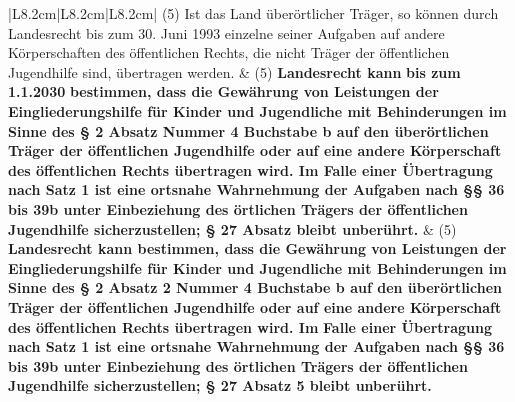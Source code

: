 \documentclass[10pt,a4paper,landscape]{article}
\begin{document}
\begin{longtable}{|L{8.2cm}|L{8.2cm}|L{8.2cm}|}
\hhline{|---|}
(5) \textcolor{diffred}{Ist das Land überörtlicher Träger, so  \newline können durch} Landesrecht \textcolor{diffred}{bis zum 30.  \newline Juni 1993 einzelne seiner Aufgaben} auf  \newline \textcolor{diffred}{andere Körperschaften des öffentlichen  \newline Rechts, die nicht} Träger der öffentlichen  \newline Jugendhilfe \textcolor{diffred}{sind,} übertragen \textcolor{diffred}{werden.} & (5) \textbf{Landesrecht kann }\textbf{\textcolor{diffred}{bis zum 1.1.2030}}\textbf{  \newline bestimmen, dass die Gewährung von  \newline Leistungen der Eingliederungshilfe für  \newline Kinder und Jugendliche mit  \newline Behinderungen im Sinne des \S{} 2 Absatz   Nummer 4 Buchstabe b auf den  \newline überörtlichen Träger der öffentlichen  \newline Jugendhilfe oder auf eine andere  \newline Körperschaft des öffentlichen Rechts  \newline übertragen wird. Im Falle einer  \newline Übertragung nach Satz 1 ist eine  \newline ortsnahe Wahrnehmung der Aufgaben  \newline nach \S{}\S{} 36 bis 39b unter Einbeziehung  \newline des örtlichen Trägers der öffentlichen  \newline Jugendhilfe sicherzustellen; \S{} 27 Absatz   bleibt unberührt.} & (5) \textbf{Landesrecht kann bestimmen, dass  \newline die Gewährung von Leistungen der  \newline Eingliederungshilfe für Kinder und  \newline Jugendliche mit Behinderungen im  \newline Sinne des \S{} 2 Absatz 2 Nummer 4  \newline Buchstabe b auf den überörtlichen  \newline Träger der öffentlichen Jugendhilfe oder  \newline auf eine andere Körperschaft des  \newline öffentlichen Rechts übertragen wird. Im } \textbf{Falle einer Übertragung nach Satz 1 ist  \newline eine ortsnahe Wahrnehmung der  \newline Aufgaben nach \S{}\S{} 36 bis 39b unter  \newline Einbeziehung des örtlichen Trägers der  \newline öffentlichen Jugendhilfe  \newline sicherzustellen; \S{} 27 Absatz 5 bleibt  \newline unberührt.} \\

\end{longtable}
\end{document}

